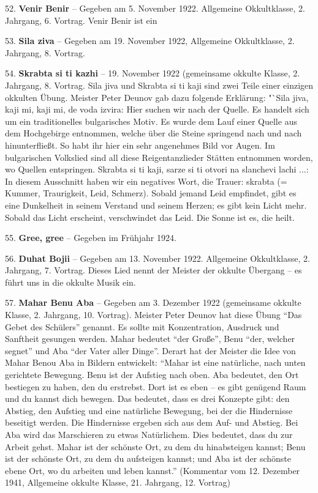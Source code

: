 \documentclass[11pt,a5paper,twoside]{article}
\begin{document}
52. \textbf{Venir Benir} -- Gegeben am 5. November 1922. Allgemeine Okkultklasse, 2. Jahrgang, 6. Vortrag. Venir Benir ist ein 

53. \textbf{Sila ziva} -- Gegeben am 19. November 1922, Allgemeine Okkultklasse, 2. Jahrgang, 8. Vortrag.

54. \textbf{Skrabta si ti kazhi} --  19. November 1922 (gemeinsame okkulte Klasse, 2. Jahrgang, 8. Vortrag. Sila jiva und Skrabta si ti kaji sind zwei Teile einer einzigen okkulten Übung. Meister Peter Deunov gab dazu folgende Erklärung: "`Sila jiva, kaji mi, kaji mi, de voda izvira: Hier suchen wir nach der Quelle. Es handelt sich um ein traditionelles bulgarisches Motiv. Es wurde dem Lauf einer Quelle aus dem Hochgebirge entnommen, welche über die Steine springend nach und nach hinunterfließt. So habt ihr hier ein sehr angenehmes Bild vor Augen. Im bulgarischen Volkslied sind all diese Reigentanzlieder Stätten entnommen worden, wo Quellen entspringen. Skrabta si ti kaji, sarze si ti otvori na slanchevi lachi ...: In diesem Ausschnitt haben wir ein negatives Wort, die Trauer: skrabta (= Kummer, Traurigkeit, Leid, Schmerz). Sobald jemand Leid empfindet, gibt es eine Dunkelheit in seinem Verstand und seinem Herzen; es gibt kein Licht mehr. Sobald das Licht erscheint, verschwindet das Leid. Die Sonne ist es, die heilt.

55. \textbf{Gree, gree} -- Gegeben im Frühjahr 1924.

56. \textbf{Duhat Bojii} -- Gegeben am 13. November 1922. Allgemeine Okkultklasse, 2. Jahrgang, 7. Vortrag. Dieses Lied nennt der Meister der okkulte Übergang -- es führt uns in die okkulte Musik ein.

57. \textbf{Mahar Benu Aba} -- Gegeben am 3. Dezember 1922 (gemeinsame okkulte Klasse, 2. Jahrgang, 10. Vortrag). Meister Peter Deunov hat diese Übung "`Das Gebet des Schülers"' genannt. Es sollte mit Konzentration, Ausdruck und Sanftheit gesungen werden. Mahar bedeutet "`der Große"', Benu "`der, welcher segnet"' und Aba "`der Vater aller Dinge"'. Derart hat der Meister die Idee von Mahar Benou Aba in Bildern entwickelt: "`Mahar ist eine natürliche, nach unten gerichtete Bewegung. Benu ist der Aufstieg nach oben. Aba bedeutet, den Ort bestiegen zu haben, den du erstrebst. Dort ist es eben -- es gibt genügend Raum und du kannst dich bewegen. Das bedeutet, dass es drei Konzepte gibt: den Abstieg, den Aufstieg und eine natürliche Bewegung, bei der die Hindernisse beseitigt werden. Die Hindernisse ergeben sich aus dem Auf- und Abstieg. Bei Aba wird das Marschieren zu etwas Natürlichem. Dies bedeutet, dass du zur Arbeit gehst. Mahar ist der schönste Ort, zu dem du hinabsteigen kannst; Benu ist der schönste Ort, zu dem du aufsteigen kannst; und Aba ist der schönste ebene Ort, wo du arbeiten und leben kannst."' (Kommentar vom 12. Dezember 1941, Allgemeine okkulte Klasse, 21. Jahrgang, 12. Vortrag)
\end{document}
